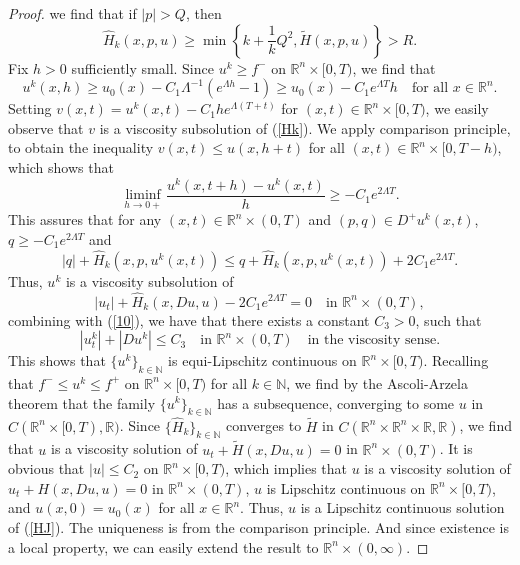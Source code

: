 \documentclass[preprint]{elsarticle}
\numberwithin{equation}{section}
\begin{document}
\begin{proof}
we find that if \(|p| > Q\), then
\[\hat{H}_k(x,p,u) \geq \min\left\{k + \frac{1}{k}Q^2, \tilde{H}(x,p,u)\right\} > R.\]
Fix \(h > 0\) sufficiently small. Since \(u^k \geq f^{-}\) on \(\mathbb R^n \times [0,T)\), we find that
\[u^k(x,h) \geq u_0(x) - C_1\Lambda^{-1}(e^{\Lambda h} - 1) \geq u_0(x) - C_1e^{\Lambda T}h \quad \text{for all } x \in \mathbb R^n.\]
Setting \(v(x,t) = u^k(x,t) - C_1he^{\Lambda(T+t)}\) for \((x,t) \in \mathbb R^n \times [0,T)\), we easily observe that \(v\) is a viscosity subsolution of (\ref{Hk}). We apply comparison principle, to obtain the inequality \(v(x,t) \leq u(x,h+t)\) for all \((x,t) \in \mathbb R^n \times [0,T-h)\), which shows that
\[\liminf_{h \to 0+} \frac{u^k(x,t+h) - u^k(x,t)}{h} \geq -C_1e^{2\Lambda T}.\]
This assures that for any \((x,t) \in  \mathbb R^n \times (0,T)\) and \((p,q) \in D^+u^k(x,t)\), \(q \geq -C_1e^{2\Lambda T}\) and
\[|q| + \hat{H}_k(x,p,u^k(x,t)) \leq q + \hat{H}_k(x,p,u^k(x,t)) + 2C_1e^{2\Lambda T}.\]
Thus, \(u^k\) is a viscosity subsolution of
\begin{equation}
    |u_t| + \hat{H}_k(x,Du,u) - 2C_1e^{2\Lambda T} = 0 \quad \text{in }  \mathbb R^n \times (0,T),
\end{equation}
combining with (\ref{10}), we have that there exists a constant $C_3>0$, such that
\[|u^k_t| + |Du^k| \leq C_3 \quad \text{in } \mathbb R^n \times (0,T) \quad \text{in the viscosity sense}.\]
This shows that \(\{u^k\}_{k \in \mathbb{N}}\) is equi-Lipschitz continuous on \(\mathbb R^n \times [0,T)\). Recalling that \(f^- \leq u^k \leq f^+\) on \(\mathbb R^n \times [0,T)\) for all \(k \in \mathbb{N}\), we find by the Ascoli-Arzela theorem that the family \(\{u^k\}_{k \in \mathbb{N}}\) has a subsequence, converging to some \(u\) in \(C(\mathbb R^n \times [0,T),\mathbb{R})\). Since \(\{\hat{H}_k\}_{k \in \mathbb{N}}\) converges to \(\tilde{H}\) in \(C(\mathbb R^n \times \mathbb R^n\times \mathbb{R},\mathbb{R})\), we find that \(u\) is a viscosity solution of \(u_t + \tilde{H}(x,Du,u) = 0\) in \(\mathbb R^n \times (0,T)\). It is obvious that \(|u| \leq C_2\) on \(\mathbb R^n \times [0,T)\), which implies that \(u\) is a viscosity solution of \(u_t + H(x,Du,u) = 0\) in \(\mathbb R^n \times (0,T)\), \(u\) is Lipschitz continuous on \(\mathbb R^n \times [0,T)\), and \(u(x,0) = u_0(x)\) for all \(x \in \mathbb R^n\). Thus, \(u\) is a Lipschitz continuous solution of (\ref{HJ}). The uniqueness is from the comparison principle.  And since existence is a local property, we can easily extend the result to \(\mathbb R^n \times (0,\infty)\).
\end{proof}
\end{document}
